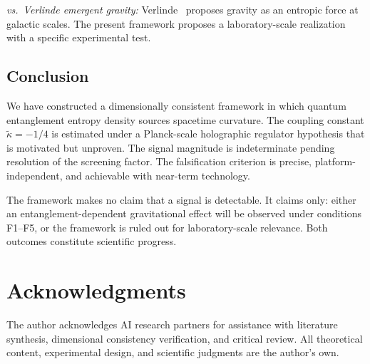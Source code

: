 \documentclass[12pt,letterpaper]{article}
\theoremstyle{plain}
\theoremstyle{definition}
\theoremstyle{remark}
\newcommand{\kt}{\tilde{\kappa}}
\begin{document}
\emph{vs.\ Verlinde emergent gravity:} Verlinde~\cite{Verlinde2017} proposes gravity as an
entropic force at galactic scales.  The present framework proposes a laboratory-scale
realization with a specific experimental test.

\subsection{Conclusion}

We have constructed a dimensionally consistent framework in which quantum entanglement entropy
density sources spacetime curvature.  The coupling constant $\kt = -1/4$ is estimated under a
Planck-scale holographic regulator hypothesis that is motivated but unproven.  The signal
magnitude is indeterminate pending resolution of the screening factor.  The falsification
criterion is precise, platform-independent, and achievable with near-term technology.

The framework makes no claim that a signal is detectable.  It claims only: either an
entanglement-dependent gravitational effect will be observed under conditions F1--F5, or the
framework is ruled out for laboratory-scale relevance.  Both outcomes constitute scientific
progress.

\section*{Acknowledgments}
The author acknowledges AI research partners for assistance with literature synthesis,
dimensional consistency verification, and critical review.  All theoretical content,
experimental design, and scientific judgments are the author's own.
\end{document}
